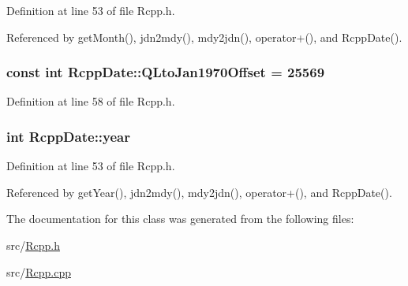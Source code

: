 Definition at line 53 of file Rcpp.h.

Referenced by getMonth(), jdn2mdy(), mdy2jdn(), operator+(), and RcppDate().\hypertarget{classRcppDate_a06b285d4a04c5225a067e76d4fbfd2d4}{
\subsubsection[{QLtoJan1970Offset}]{\setlength{\rightskip}{0pt plus 5cm}const int {\bf RcppDate::QLtoJan1970Offset} = 25569}}
\label{classRcppDate_a06b285d4a04c5225a067e76d4fbfd2d4}


Definition at line 58 of file Rcpp.h.\hypertarget{classRcppDate_a8881f654ebf42cdf71fdcfce402f0cad}{
\subsubsection[{year}]{\setlength{\rightskip}{0pt plus 5cm}int {\bf RcppDate::year}}}
\label{classRcppDate_a8881f654ebf42cdf71fdcfce402f0cad}


Definition at line 53 of file Rcpp.h.

Referenced by getYear(), jdn2mdy(), mdy2jdn(), operator+(), and RcppDate().

The documentation for this class was generated from the following files:\begin{DoxyCompactItemize}
\item 
src/\hyperlink{Rcpp_8h}{Rcpp.h}\item 
src/\hyperlink{Rcpp_8cpp}{Rcpp.cpp}\end{DoxyCompactItemize}
